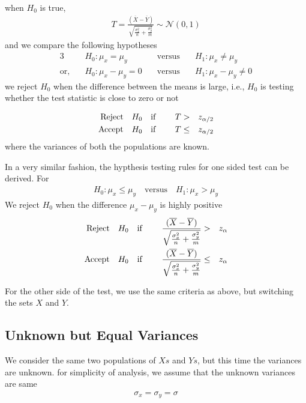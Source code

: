 \documentclass[../probability-notes.tex]{subfiles}
\begin{document}
    when $H_{0}$ is true,
    \begin{align*}
        T = \frac{(\overline{X} - \overline{Y})}{\sqrt{\frac{\sigma_{x}^{2}}{n} + \frac{\sigma_{y}^{2}}{m}}} \sim \mathcal{N}(0, 1)
    \end{align*}
    and we compare the following hypotheses
    \begin{alignat*}{3}
        &H_{0}: \mu_{x} = \mu_{y} \quad &\text{versus} \quad &H_{1}: \mu_{x} \neq \mu_{y}\\
        \text{or,} \quad &H_{0}: \mu_{x} - \mu_{y} = 0 \quad &\text{versus} \quad &H_{1}: \mu_{x} - \mu_{y} \neq 0
    \end{alignat*}
    we reject $H_{0}$ when the difference between the means is large, i.e., $H_{0}$ is testing whether the test statistic is close to zero or not

    \begin{alignat*}{4}
        \text{Reject\quad} &H_{0} \text{\quad if \quad} &T &> &z_{\alpha/2}\\
        \text{Accept\quad} &H_{0} \text{\quad if\quad} &T &\leq &z_{\alpha/2}
    \end{alignat*}
    where the variances of both the populations are known.\newline

    In a very similar fashion, the hypthesis testing rules for one sided test can be derived.\newline
    For
    \begin{align*}
        H_{0}: \mu_{x} \leq \mu_{y} \quad \text{versus} \quad H_{1}: \mu_{x} > \mu_{y}
    \end{align*}
    We reject $H_{0}$ when the difference $\mu_{x} - \mu_{y}$ is highly positive
    \begin{alignat*}{4}
        \text{Reject\quad} &H_{0} \text{\quad if \quad} &\frac{(\overline{X} - \overline{Y})}{\sqrt{\frac{\sigma_{x}^{2}}{n} + \frac{\sigma_{y}^{2}}{m}}} &> &z_{\alpha}\\
        \text{Accept\quad} &H_{0} \text{\quad if\quad} &\frac{(\overline{X} - \overline{Y})}{\sqrt{\frac{\sigma_{x}^{2}}{n} + \frac{\sigma_{y}^{2}}{m}}} &\leq &z_{\alpha}
    \end{alignat*}

    For the other side of the test, we use the same criteria as above, but switching the sets $X$ and $Y$.


    \subsection{Unknown but Equal Variances}
    We consider the same two populations of $Xs$ and $Ys$, but this time the variances are unknown. for simplicity of analysis, we assume that the unknown variances are same
    \begin{align*}
        \sigma_{x} = \sigma_{y} = \sigma
    \end{align*}
\end{document}
